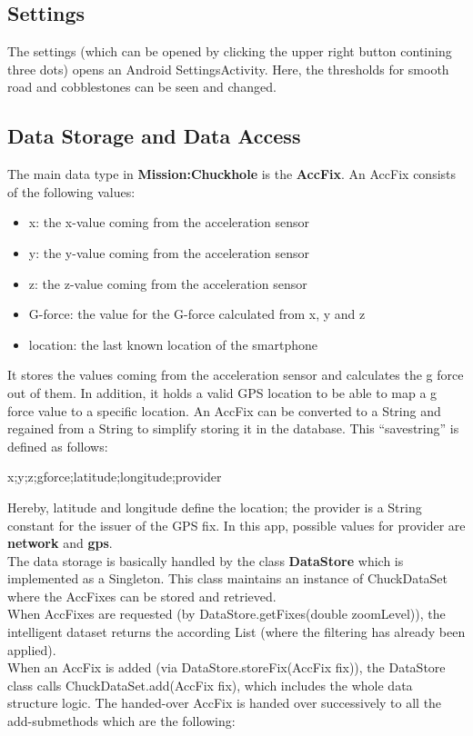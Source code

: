 \documentclass[10pt,a4paper]{article} %
\begin{document}
		
	\subsection{Settings}

	The settings (which can be opened by clicking the upper right button contining three dots) opens an Android SettingsActivity.
	Here, the thresholds for smooth road and cobblestones can be seen and changed.





	\subsection{Data Storage and Data Access}\label{subsec:datastorage}

	The main data type in \textbf{Mission:Chuckhole} is the \textbf{AccFix}.
	An AccFix consists of the following values:

	\begin{itemize}
		\item x: the x-value coming from the acceleration sensor
		\item y: the y-value coming from the acceleration sensor
		\item z: the z-value coming from the acceleration sensor
		\item G-force: the value for the G-force calculated from x, y and z
		\item location: the last known location of the smartphone
	\end{itemize}

	\noindent
	It stores the values coming from the acceleration sensor and calculates the g force out of them.
	In addition, it holds a valid GPS location to be able to map a g force value to a specific location.
	An AccFix can be converted to a String and regained from a String to simplify storing it in the database.
	This ``savestring'' is defined as follows:

	\begin{center}
		x;y;z;gforce;latitude;longitude;provider
	\end{center}
	
	\noindent
	Hereby, latitude and longitude define the location; the provider is a String constant for the issuer of the GPS fix.
	In this app, possible values for provider are \textbf{network} and \textbf{gps}.\\

	\noindent
	The data storage is basically handled by the class \textbf{DataStore} which is implemented as a Singleton.
	This class maintains an instance of ChuckDataSet where the AccFixes can be stored and retrieved.\\
	When AccFixes are requested (by DataStore.getFixes(double zoomLevel)), the intelligent dataset returns the according List (where the filtering has already been applied).\\
	When an AccFix is added (via DataStore.storeFix(AccFix fix)), the DataStore class calls ChuckDataSet.add(AccFix fix), which includes the whole data structure logic.
	The handed-over AccFix is handed over successively to all the add-submethods which are the following: %
\end{document}
